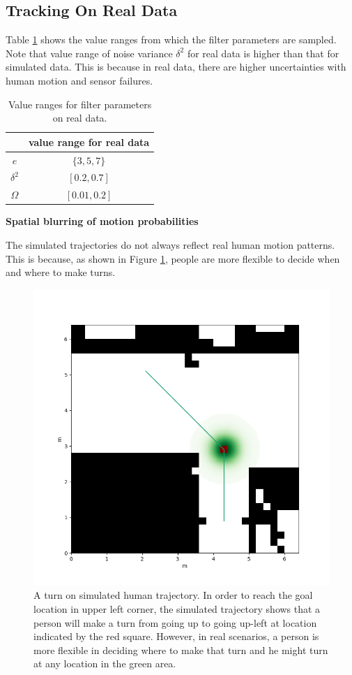 \subsection{Tracking On Real Data}

Table \ref{table:param_range_real} shows the value ranges from which the filter parameters are sampled. Note that value range of noise variance $\delta^2$ for real data is higher than that for simulated data. This is because in real data, there are higher uncertainties with human motion and sensor failures.

\begin{table}[H]
\centering
  \begin{tabular}{c|c}
    \hline
     &  value range for real data \\ \hline
    \( e \) &  \( \{3, 5, 7\} \)\\
    \(  \delta^2\) & \( [0.2, 0.7]\) \\   
   \( \Omega \) & \( [0.01, 0.2] \)\\
   \hline
 \end{tabular}
\caption{Value ranges for filter parameters on real data.}
\label{table:param_range_real}
\end{table}

\textbf{Spatial blurring of motion probabilities}

The simulated trajectories do not always reflect real human motion patterns. This is because, as shown in Figure \ref{fig:blur_idea}, people are more flexible to decide when and where to make turns. 

\begin{figure}[ht]
  \centering
   \captionsetup{width=\linewidth}
    \includegraphics[width=.6\textwidth]{figures/blur_idea.png}
    \caption[A turn on simulated human trajectory.]{A turn on simulated human trajectory. In order to reach the goal location in upper left corner, the simulated trajectory shows that a person will make a turn from going up to going up-left at location indicated by the red square. However, in real scenarios, a person is more flexible in deciding where to make that turn and he might turn at any location in the green area.}
    \label{fig:blur_idea}
\end{figure}


